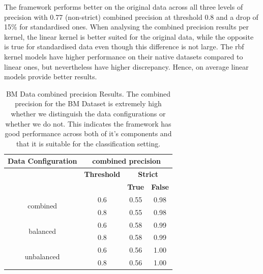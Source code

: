 \documentclass{mpaper}
\begin{document}
The framework performs better on the original data across all three levels of precision with 0.77 (non-strict) combined precision at threshold 0.8 and a drop of 15\% for standardised ones.  When analysing the combined precision results per kernel, the linear kernel is better suited for the original data, while the opposite is true for standardised data even though this difference is not large. The rbf kernel models have higher performance on their native datasets compared to linear ones, but nevertheless have higher discrepancy. Hence, on average linear models provide better results.

\begin{table}[]
\centering
\begin{tabular}{|c|ccc|}
\hline
\textbf{Data Configuration} & \multicolumn{3}{c|}{\textbf{combined precision}}                                              \\ \hline
                              & \multicolumn{1}{c|}{\textbf{Threshold}} & \multicolumn{2}{c|}{\textbf{Strict}}                \\ \cline{2-4} 
                              & \multicolumn{1}{c|}{\textbf{}}          & \textbf{True} & \multicolumn{1}{l|}{\textbf{False}} \\ \hline
\multirow{2}{*}{combined}     & \multicolumn{1}{c|}{0.6}                & 0.55          & 0.98                                \\
                              & \multicolumn{1}{c|}{0.8}                & 0.55          & 0.98                                \\ \hline
\multirow{2}{*}{balanced}     & \multicolumn{1}{c|}{0.6}                & 0.58          & 0.99                                \\
                              & \multicolumn{1}{c|}{0.8}                & 0.58          & 0.99                                \\ \hline
\multirow{2}{*}{unbalanced}   & \multicolumn{1}{c|}{0.6}                & 0.56          & 1.00                                \\
                              & \multicolumn{1}{c|}{0.8}                & 0.56          & 1.00                                \\ \hline
\end{tabular}
\caption{\label{tab:bm_combined_precision}BM Data combined precision Results. The combined precision for the BM Dataset is extremely high whether we distinguish the data configurations or whether we do not. This indicates the framework has good performance across both of it's components and that it is suitable for the classification setting. }
\end{table}
\end{document}
